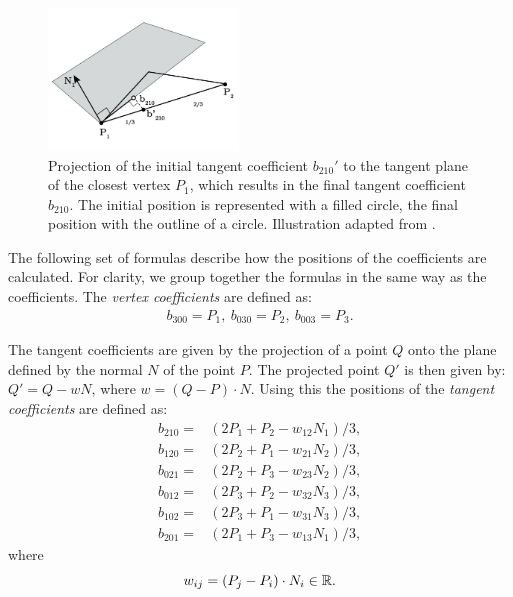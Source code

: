 	\begin{figure}
		\centering
		\includegraphics[width=0.45\textwidth]{./content/img/method/geometry_computation.png}
		\caption{Projection of the initial tangent coefficient $b_{210}'$ to the tangent plane of the closest vertex $P_1$, which results in the final tangent coefficient $b_{210}$. The initial position is represented with a filled circle, the final position with the outline of a circle. Illustration adapted from \textcite{vlachos2001curved}.}
		\label{fig:method:geometry_tangent_projection.png}
	\end{figure}

	The following set of formulas describe how the positions of the coefficients are calculated. For clarity, we group together the formulas in the same way as the coefficients. The \textit{vertex coefficients} are defined as:
	\begin{align}\label{eq:method:vertex_coefficients}
		b_{300} = P_1,\ b_{030} = P_2,\ b_{003} = P_3.
	\end{align}

	The tangent coefficients are given by the projection of a point $Q$ onto the plane defined by the normal $N$ of the point $P$. The projected point $Q'$ is then given by: $Q' = Q - wN$, where $w = (Q - P) \cdot N$. Using this the positions of the \textit{tangent coefficients} are defined as:
	\begin{equation}\label{eq:method:tangent_coefficients}
		\begin{aligned}
			b_{210} = {}& (2 P_1 + P_2 - w_{12}N_1) / 3,\\
			b_{120} = {}& (2 P_2 + P_1 - w_{21}N_2) / 3,\\
			b_{021} = {}& (2 P_2 + P_3 - w_{23}N_2) / 3,\\
			b_{012} = {}& (2 P_3 + P_2 - w_{32}N_3) / 3,\\
			b_{102} = {}& (2 P_3 + P_1 - w_{31}N_3) / 3,\\
			b_{201} = {}& (2 P_1 + P_3 - w_{13}N_1) / 3, 
		\end{aligned}		
	\end{equation}
	where
	\begin{equation*}
		w_{ij} = (P_j - P_i) \cdot N_i \in \mathbb{R}.
	\end{equation*}


